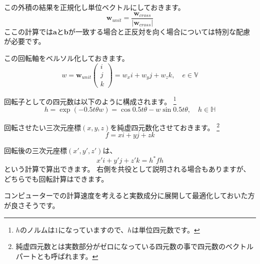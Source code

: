 \documentclass[a4paper,12pt,notitlepage]{jsreport}
\begin{document}
この外積の結果を正規化し単位ベクトルにしておきます。
\begin{equation}
\bm{w}_{unit}=\frac{\bm{w}_{cross}}{|\bm{w}_{cross}|}
\end{equation}
ここの計算では$\bm{a}$と$\bm{b}$が一致する場合と正反対を向く場合については特別な配慮が必要です。

この回転軸をベルソル化しておきます。
\begin{equation}
w=\bm{w}_{unit}\begin{pmatrix}i\\j\\k\end{pmatrix}=w_xi+w_yj+w_zk,\quad e\in\mathbb{V}
\end{equation}

回転子としての四元数は以下のように構成されます。
\footnote{$h$のノルムは$1$になっていますので、$h$は単位四元数です。}
\begin{equation}
h=\exp(-0.5t\theta w)=\cos 0.5t\theta-w\sin 0.5t\theta,\quad h\in\mathbb{H}
\end{equation}

回転させたい三次元座標$(x,y,z)$を純虚四元数化させておきます。
\footnote{純虚四元数とは実数部分がゼロになっている四元数の事で四元数のベクトルパートとも呼ばれます。}
\begin{equation}
f=xi+yj+zk
\end{equation}

回転後の三次元座標$(x',y',z')$は、
\begin{equation}
x'i+y'j+z'k=h^*fh
\end{equation}
という計算で算出できます。
右側を共役として説明される場合もありますが、どちらでも回転計算はできます。

コンピューターでの計算速度を考えると実数成分に展開して最適化しておいた方が良さそうです。
\end{document}
